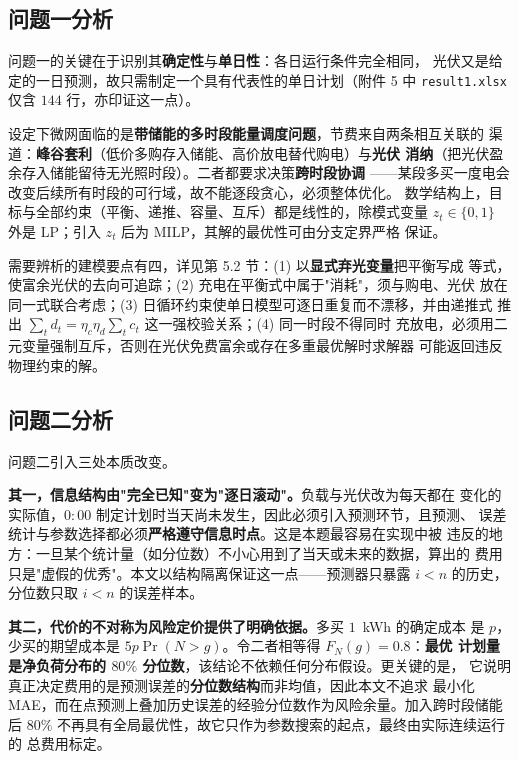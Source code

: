 \documentclass[withoutpreface,bwprint]{cumcmthesis}
\begin{document}
\subsection{问题一分析}

问题一的关键在于识别其\textbf{确定性}与\textbf{单日性}：各日运行条件完全相同，
光伏又是给定的一日预测，故只需制定一个具有代表性的单日计划（附件 5 中
\texttt{result1.xlsx} 仅含 $144$ 行，亦印证这一点）。

设定下微网面临的是\textbf{带储能的多时段能量调度问题}，节费来自两条相互关联的
渠道：\textbf{峰谷套利}（低价多购存入储能、高价放电替代购电）与\textbf{光伏
消纳}（把光伏盈余存入储能留待无光照时段）。二者都要求决策\textbf{跨时段协调}
——某段多买一度电会改变后续所有时段的可行域，故不能逐段贪心，必须整体优化。
数学结构上，目标与全部约束（平衡、递推、容量、互斥）都是线性的，除模式变量
$z_t\in\{0,1\}$ 外是 LP；引入 $z_t$ 后为 MILP，其解的最优性可由分支定界严格
保证。

需要辨析的建模要点有四，详见第 5.2 节：(1) 以\textbf{显式弃光变量}把平衡写成
等式，使富余光伏的去向可追踪；(2) 充电在平衡式中属于"消耗"，须与购电、光伏
放在同一式联合考虑；(3) 日循环约束使单日模型可逐日重复而不漂移，并由递推式
推出 $\sum_t d_t=\eta_c\eta_d\sum_t c_t$ 这一强校验关系；(4) 同一时段不得同时
充放电，必须用二元变量强制互斥，否则在光伏免费富余或存在多重最优解时求解器
可能返回违反物理约束的解。

\subsection{问题二分析}

问题二引入三处本质改变。

\textbf{其一，信息结构由"完全已知"变为"逐日滚动"。}负载与光伏改为每天都在
变化的实际值，$0{:}00$ 制定计划时当天尚未发生，因此必须引入预测环节，且预测、
误差统计与参数选择都必须\textbf{严格遵守信息时点}。这是本题最容易在实现中被
违反的地方：一旦某个统计量（如分位数）不小心用到了当天或未来的数据，算出的
费用只是"虚假的优秀"。本文以结构隔离保证这一点——预测器只暴露 $i<n$ 的历史，
分位数只取 $i<n$ 的误差样本。

\textbf{其二，代价的不对称为风险定价提供了明确依据。}多买 $1$~kWh 的确定成本
是 $p$，少买的期望成本是 $5p\Pr(N>g)$。令二者相等得 $F_N(g)=0.8$：\textbf{最优
计划量是净负荷分布的 $80\%$ 分位数}，该结论不依赖任何分布假设。更关键的是，
它说明真正决定费用的是预测误差的\textbf{分位数结构}而非均值，因此本文不追求
最小化 MAE，而在点预测上叠加历史误差的经验分位数作为风险余量。加入跨时段储能
后 $80\%$ 不再具有全局最优性，故它只作为参数搜索的起点，最终由实际连续运行的
总费用标定。
\end{document}
